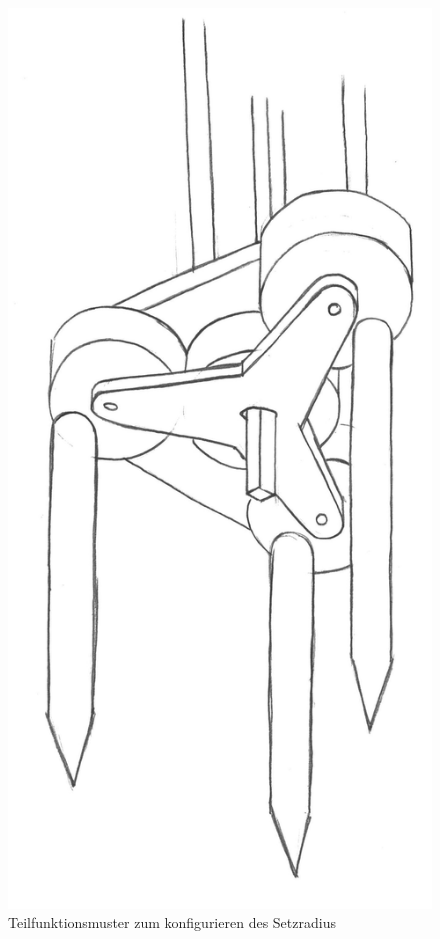 \begin{figure}[H]
	\includegraphics[scale=0.45]{Illustrationen/5-Konzept/blau_Verstellmechanismus.jpg}
	\caption{Teilfunktionsmuster zum konfigurieren des Setzradius}
	\label{fig:blau_verstellmech}
\end{figure}

